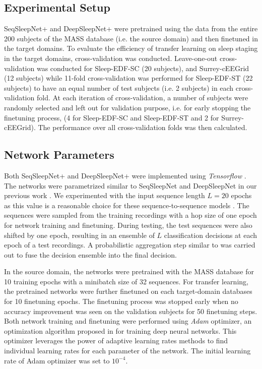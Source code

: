 \documentclass[journal,twoside,web]{ieeecolor}
\begin{document}
\subsection{Experimental Setup}
SeqSleepNet+ and DeepSleepNet+ were pretrained using the data from the entire 200 subjects of the MASS database (i.e. the source domain) and then finetuned in the target domains. To evaluate the efficiency of transfer learning on sleep staging in the target domains, cross-validation was conducted. Leave-one-out cross-validation was conducted for Sleep-EDF-SC (20 subjects), and Surrey-cEEGrid (12 subjects) while 11-fold cross-validation was performed for Sleep-EDF-ST (22 subjects) to have an equal number of test subjects (i.e. 2 subjects) in each cross-validation fold. At each iteration of cross-validation, a number of subjects were randomly selected and left out for validation purpose, i.e. for early stopping the finetuning process, (4 for Sleep-EDF-SC and Sleep-EDF-ST and 2 for Surrey-cEEGrid). The performance over all cross-validation folds was then calculated. 

\vspace{-0.25cm}
\subsection{Network Parameters}
Both SeqSleepNet+ and DeepSleepNet+ were implemented using \emph{Tensorflow} \cite{Abadi2016}. The networks were parametrized similar to SeqSleepNet and DeepSleepNet in our previous work \cite{Phan2019a}. We experimented with the input sequence length $L = 20$ epochs as this value is a reasonable choice for these sequence-to-sequence models \cite{Phan2019a}. The sequences were sampled from the training recordings with a hop size of one epoch for network training and finetuning. During testing, the test sequences were also shifted by one epoch, resulting in an ensemble of $L$ classification decisions at each epoch of a test recordings. A probabilistic aggregation step similar to \cite{Phan2019a} was carried out to fuse the decision ensemble into the final decision.

In the source domain, the networks were pretrained with the MASS database for 10 training epochs with a minibatch size of 32 sequences. For transfer learning, the pretrained networks were further finetuned on each target-domain databases for 10 finetuning epochs. The finetuning process was stopped early when no accuracy improvement was seen on the validation subjects for 50 finetuning steps. Both network training and finetuning were performed using \emph{Adam} optimizer, an optimization algorithm proposed in \cite{Kingma2015} for training deep neural networks. This optimizer leverages the power of adaptive learning rates methods to find individual learning rates for each parameter of the network. The initial learning rate of Adam optimizer was set to $10^{-4}$.
\end{document}
